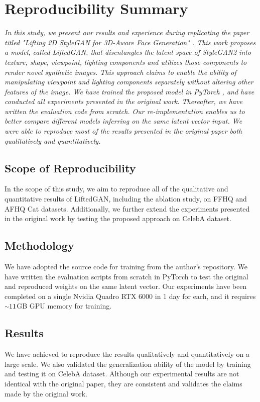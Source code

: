 \section*{\centering Reproducibility Summary}

\textit{In this study, we present our results and experience during replicating the paper titled "Lifting 2D StyleGAN for 3D-Aware Face Generation" \cite{shi2021lifting}. This work proposes a model, called LiftedGAN, that disentangles the latent space of StyleGAN2 \cite{karras2020analyzing} into texture, shape, viewpoint, lighting components and utilizes those components to render novel synthetic images. This approach claims to enable the ability of manipulating viewpoint and lighting components separately without altering other features of the image. We have trained the proposed model in PyTorch \cite{NEURIPS2019_9015}, and have conducted all experiments presented in the original work. Thereafter, we have written the evaluation code from scratch. Our re-implementation enables us to better compare different models inferring on the same latent vector input. We were able to reproduce most of the results presented in the original paper both qualitatively and quantitatively.
}

\subsection*{Scope of Reproducibility}

In the scope of this study, we aim to reproduce all of the qualitative and quantitative results of LiftedGAN, including the ablation study, on FFHQ \cite{karras2019stylebased} and AFHQ Cat \cite{choi2020stargan} datasets. Additionally, we further extend the experiments presented in the original work by testing the proposed approach on CelebA \cite{liu2015faceattributes} dataset.

\subsection*{Methodology}
We have adopted the source code for training from the author’s repository. We have written the evaluation scripts from scratch in PyTorch to test the original and reproduced weights on the same latent vector. Our experiments have been completed on a single Nvidia Quadro RTX 6000 in 1 day for each, and it requires ${\raise.17ex\hbox{$\scriptstyle\mathtt{\sim}$}}11$GB GPU memory for training.

\subsection*{Results}
We have achieved to reproduce the results qualitatively and quantitatively on a large scale. We also validated the generalization ability of the model by training and testing it on CelebA dataset. Although our experimental results are not identical with the original paper, they are consistent and validates the claims made by the original work.

